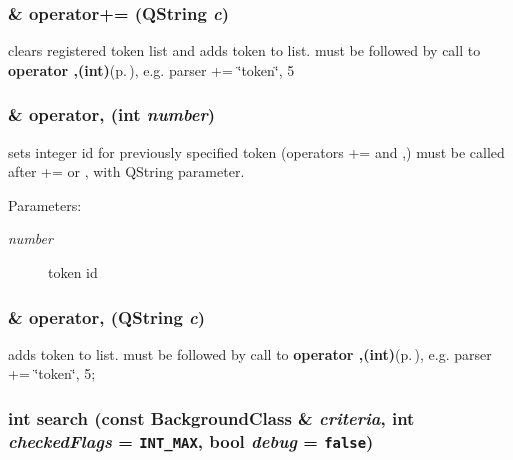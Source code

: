 \subsubsection{ \& operator+= (QString {\em c})\hspace{0.3cm}{\tt  [protected]}}\label{classTables_b1}


clears registered token list and adds token to list. must be followed by call to {\bf operator ,(int)}{\rm (p.\,\pageref{classTables_b3})}, e.g. parser += \char`\"{}token\char`\"{}, 5 

\subsubsection{ \& operator, (int {\em number})\hspace{0.3cm}{\tt  [protected]}}\label{classTables_b3}


sets integer id for previously specified token (operators += and ,) must be called after += or , with QString parameter. 

\begin{Desc}
\item[Parameters:]
\begin{description}
\item[{\em number}]token id\end{description}
\end{Desc}
\subsubsection{ \& operator, (QString {\em c})\hspace{0.3cm}{\tt  [protected]}}\label{classTables_b2}


adds token to list. must be followed by call to {\bf operator ,(int)}{\rm (p.\,\pageref{classTables_b3})}, e.g. parser += \char`\"{}token\char`\"{}, 5; 

\subsubsection{\setlength{\rightskip}{0pt plus 5cm}int search (const {\bf Background\-Class} \& {\em criteria}, int {\em checked\-Flags} = {\tt INT\_\-MAX}, bool {\em debug} = {\tt false})\hspace{0.3cm}{\tt  [static]}}\label{classTables_e10}


